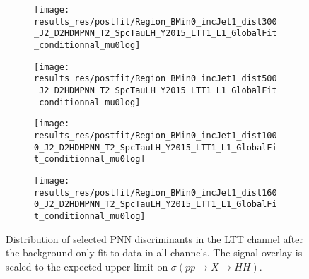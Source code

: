 \begin{figure}[htbp]
  \centering

  \begin{subfigure}{0.495\textwidth}
    \centering

    \texttt{[image: results\_res/postfit/Region\_BMin0\_incJet1\_dist300\_J2\_D2HDMPNN\_T2\_SpcTauLH\_Y2015\_LTT1\_L1\_GlobalFit\_conditionnal\_mu0log]}
  \end{subfigure}\hfill%
  \begin{subfigure}{0.495\textwidth}
    \centering

    \texttt{[image: results\_res/postfit/Region\_BMin0\_incJet1\_dist500\_J2\_D2HDMPNN\_T2\_SpcTauLH\_Y2015\_LTT1\_L1\_GlobalFit\_conditionnal\_mu0log]}
  \end{subfigure}

  \begin{subfigure}{0.495\textwidth}
    \centering

    \texttt{[image: results\_res/postfit/Region\_BMin0\_incJet1\_dist1000\_J2\_D2HDMPNN\_T2\_SpcTauLH\_Y2015\_LTT1\_L1\_GlobalFit\_conditionnal\_mu0log]}
  \end{subfigure}\hfill%
  \begin{subfigure}{0.495\textwidth}
    \centering

    \texttt{[image: results\_res/postfit/Region\_BMin0\_incJet1\_dist1600\_J2\_D2HDMPNN\_T2\_SpcTauLH\_Y2015\_LTT1\_L1\_GlobalFit\_conditionnal\_mu0log]}
  \end{subfigure}

  \caption[Distribution of selected PNN discriminants in the \lephad LTT channel
  after the background-only fit to data in all channels]{Distribution of
    selected PNN discriminants in the \lephad LTT channel after the
    background-only fit to data in all channels. The signal overlay is scaled to
    the expected upper limit on $\sigma(pp \to X \to HH)$.}
\end{figure}



